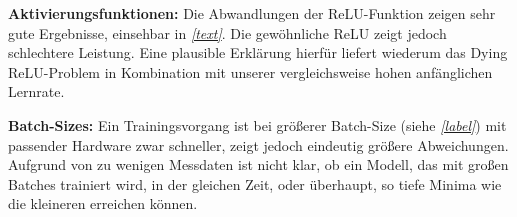 \textbf{Aktivierungsfunktionen:} %
Die Abwandlungen der ReLU-Funktion zeigen sehr gute Ergebnisse, einsehbar in \textit{\autoref{text}}. Die gewöhnliche ReLU zeigt jedoch schlechtere Leistung. Eine plausible Erklärung hierfür liefert wiederum das \grqq Dying ReLU\grqq-Problem in Kombination mit unserer vergleichsweise hohen anfänglichen Lernrate.  

\textbf{Batch-Sizes:}
Ein Trainingsvorgang ist bei größerer Batch-Size (siehe \textit{\autoref{label}}) mit passender Hardware zwar schneller, zeigt jedoch eindeutig größere Abweichungen. Aufgrund von zu wenigen Messdaten ist nicht klar, ob ein Modell, das mit großen Batches trainiert wird, in der gleichen Zeit, oder überhaupt, so tiefe Minima wie die kleineren erreichen können. 
\begin{figure}[tbp] %
	\centering
	\\

\end{figure}
